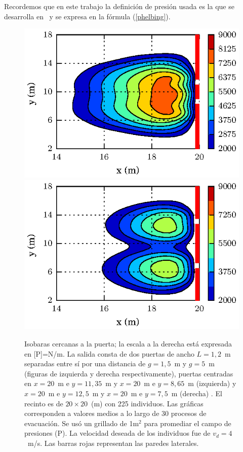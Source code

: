 Recordemos que en este trabajo la definición de presión usada es la que se desarrolla en~\cite{Helbing1} y se expresa en la fórmula (\ref{phelbing}).

\begin{figure}[H]
    \centering
    \includegraphics[scale=1]{figuras/isobaras_g1_5.eps}
    \hfill
        \includegraphics[scale=1]{figuras/isobaras_g5.eps}	
    \caption[width=5cm]{Isobaras cercanas a la puerta; la escala a la derecha está expresada en [P]=N/m. La salida consta de dos puertas de ancho $L=1,2$~m separadas entre sí por una distancia de $g=1,5$~m y $g=5$~m (figuras de izquierda y derecha respectivamente), puertas centradas en $x=20$~m e $y=11,35$~m y $x=20$~m e $y=8,65$~m (izquierda) y $x=20$~m e $y=12,5$~m y $x=20$~m e $y=7,5$~m (derecha) . El recinto es de $20\times 20$~(m) con 225 individuos. Las gráficas corresponden a valores medios a lo largo de 30 procesos de evacuación. Se usó un grillado de 1m$^2$ para promediar el campo de presiones (P). La velocidad deseada de los individuos fue de $v_d=4$~m/s. Las barras rojas representan las paredes laterales.}
    \label{presion_225p_g1_5_y_5}
\end{figure}

